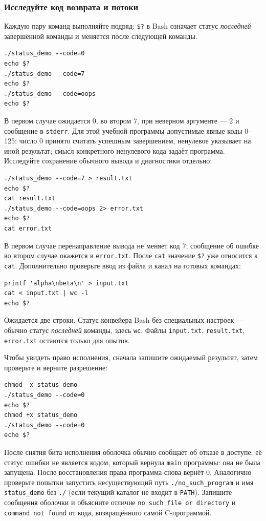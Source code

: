 \subsubsection*{Исследуйте код возврата и потоки}

Каждую пару команд выполняйте подряд: \texttt{\$?} в Bash означает статус
\emph{последней} завершённой команды и меняется после следующей команды.

\begin{verbatim}
./status_demo --code=0
echo $?
./status_demo --code=7
echo $?
./status_demo --code=oops
echo $?
\end{verbatim}

В первом случае ожидается 0, во втором 7, при неверном аргументе --- 2 и
сообщение в \texttt{stderr}. Для этой учебной программы допустимые явные
коды 0--125: число 0 принято считать успешным завершением, ненулевое
указывает на иной результат; смысл конкретного ненулевого кода задаёт
программа. Исследуйте сохранение обычного вывода и диагностики отдельно:

\begin{verbatim}
./status_demo --code=7 > result.txt
echo $?
cat result.txt
./status_demo --code=oops 2> error.txt
echo $?
cat error.txt
\end{verbatim}

В первом случае перенаправление вывода не меняет код 7; сообщение об ошибке
во втором случае окажется в \texttt{error.txt}. После \texttt{cat} значение
\texttt{\$?} уже относится к \texttt{cat}. Дополнительно проверьте ввод из
файла и канал на готовых командах:

\begin{verbatim}
printf 'alpha\nbeta\n' > input.txt
cat < input.txt | wc -l
echo $?
\end{verbatim}

Ожидается две строки. Статус конвейера Bash без специальных настроек ---
обычно статус \emph{последней} команды, здесь \texttt{wc}. Файлы
\texttt{input.txt}, \texttt{result.txt},
\texttt{error.txt} остаются только для опытов.

Чтобы увидеть право исполнения, сначала запишите ожидаемый результат, затем
проверьте и верните разрешение:

\begin{verbatim}
chmod -x status_demo
./status_demo --code=0
echo $?
chmod +x status_demo
./status_demo --code=0
echo $?
\end{verbatim}

После снятия бита исполнения оболочка обычно сообщает об отказе в доступе;
её статус ошибки не является кодом, который вернула \texttt{main} программы:
она не была запущена. После восстановления права программа снова вернёт 0.
Аналогично проверьте попытки запустить несуществующий путь
\texttt{./no\_such\_program} и имя \texttt{status\_demo} без
\texttt{./} (если текущий каталог не входит в \texttt{PATH}). Запишите
сообщения оболочки и объясните отличие \texttt{no such file or directory}
и \texttt{command not found} от кода, возвращённого самой C-программой.

